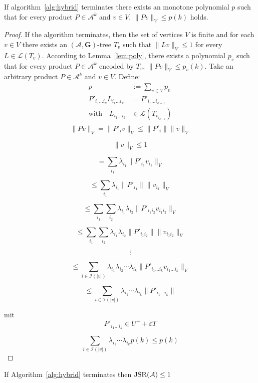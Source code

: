 \begin{lemma}
  \label{lem:arb.prod.bound}
  If algorithm~\ref{alg:hybrid} terminates there exists an monotone polynomial $p$ such that for every product $P \in \mathcal{A}^k$ and $v \in V$, $\lVert Pv \rVert _V \le p(k)$ holds.
\end{lemma}

\begin{proof}
If the algorithm terminates, then the set of vertices $V$ is finite and for each $v \in V$ there exists an $(\mathcal{A},\mathbf{G})\text{-tree } T_v$ such that $\lVert Lv \rVert _V \leq 1$ for every $L \in \mathcal{L}(T_v)$. According to Lemma~\ref{lem:poly}, there exists a polynomial $p_v$ such that for every product $P \in \mathcal{A}^k$ encoded by $T_v$, $\lVert Pv \rVert _V \leq p_v(k)$.
Take an arbitrary product $P \in \mathcal{A}^k$ and $v \in V$.
Define: 
$$
\begin{aligned}
p & := \sum \limits_{v \in V} p_v \\
P'_{i_1 \dots i_k} L_{i_1 \dots i_k} & = P'_{i_1 \dots i_{k-1}}\\
 \text{with} \quad L_{i_1 \dots i_k} & \in  \mathcal{L}(T_{v_{i_{k-1}}}) \\
\end{aligned}
$$
\[
\|Pv\|_V = \| P'_i v \|_V \leq \| P'_i \| \| v \|_V
\]

\[
\| v \|_V \leq 1
\]

\[
= \sum_{i_1} \lambda_{i_1} \| P'_{i_1} v_{i_1} \|_V
\]

\[
\leq \sum_{i_1} \lambda_{i_1} \| P'_{i_1} \| \| v_{i_1} \|_V
\]

\[
\leq \sum_{i_1} \sum_{i_2} \lambda_{i_1} \lambda_{i_2} \| P'_{i_1 i_2} v_{i_1 i_2} \|_V
\]

\[
\leq \sum_{i_1} \sum_{i_2} \lambda_{i_1} \lambda_{i_2} \| P'_{i_1 i_2} \| \| v_{i_1 i_2} \|_V
\]

\[
\vdots
\]

\[
\leq \sum_{i \in \mathcal{I}( |v| )} \lambda_{i_1} \lambda_{i_2} \cdots \lambda_{i_k} \| P'_{i_1 \dots i_k} v_{i_1 \dots i_k} \|_V
\]

\[
\leq \sum_{i \in \mathcal{I} (|v| )} \lambda_{i_1} \cdots \lambda_{i_k} \| P'_{i_1 \dots i_k} \|
\]

mit  
\[
P'_{i_1 \dots i_k} \in U^+ + \varepsilon T
\]

\[
\sum_{i \in \mathcal{I}(|v|)} \lambda_{i_1} \cdots \lambda_{i_k} p(k) \leq p(k)
\]
\end{proof}

\begin{theorem}{}\label{thm:hybrid-found}
If Algorithm~\ref{alg:hybrid} terminates then $\operatorname{JSR}(\mathcal{A}) \leq 1$
\end{theorem}

